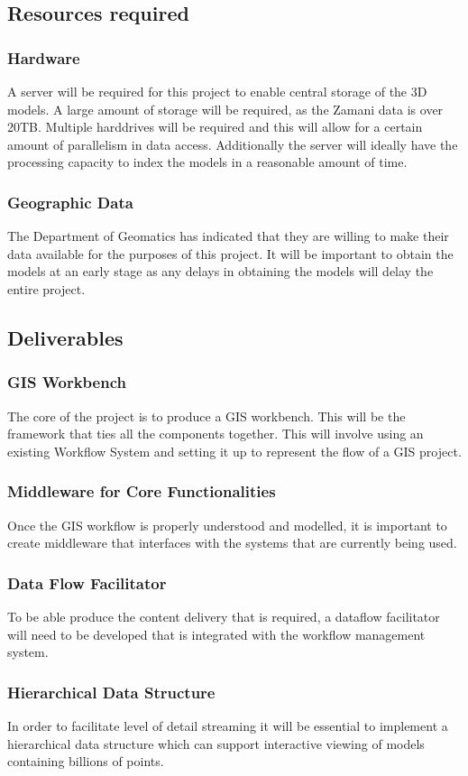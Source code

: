 \documentclass[12pt,a4paper]{article}
\begin{document}
\subsection{Resources required}
\subsubsection*{Hardware}
A server will be required for this project to enable central storage of the 3D models.
A large amount of storage will be required, as the Zamani data is over 20TB. Multiple
harddrives will be required and this will allow for a certain amount of parallelism in
data access. Additionally the server will ideally have the processing capacity to index
the models in a reasonable amount of time.
\subsubsection*{Geographic Data}
The Department of Geomatics has indicated that they are willing to make their data
available for the purposes of this project. It will be important to obtain the
models at an early stage as any delays in obtaining the models will delay the entire project.
\subsection{Deliverables}
\subsubsection*{GIS Workbench}
The core of the project is to produce a GIS workbench. This will
be the framework that ties all the components together. This will involve
using an existing Workflow System and setting it up to represent the
flow of a GIS project.
\subsubsection*{Middleware for Core Functionalities}
Once the GIS workflow is properly understood and modelled, it is
important to create middleware that interfaces with the systems that are
currently being used.
\subsubsection*{Data Flow Facilitator}
To be able produce the content delivery that is required, a dataflow
facilitator will need to be developed that is integrated with the
workflow management system.
\subsubsection*{Hierarchical Data Structure}
In order to facilitate level of detail streaming it will be essential to
implement a hierarchical data structure which can support interactive
viewing of models containing billions of points.
\end{document}
